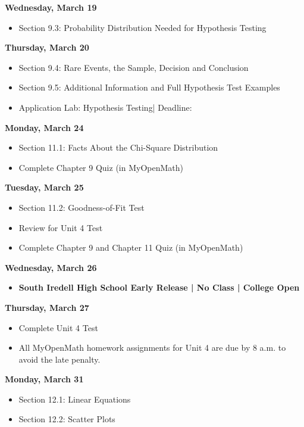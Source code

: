\documentclass[11pt]{article}
\begin{document}
\textbf{Wednesday, March 19}

\begin{itemize}
\item Section 9.3: Probability Distribution Needed for Hypothesis Testing
\end{itemize}

\textbf{Thursday, March 20}

\begin{itemize}
\item Section 9.4: Rare Events, the Sample, Decision and Conclusion
\item Section 9.5: Additional Information and Full Hypothesis Test Examples
\item Application Lab: Hypothesis Testing| Deadline:
\end{itemize}

\textbf{Monday, March 24}

\begin{itemize}
\item Section 11.1: Facts About the Chi-Square Distribution
\item Complete Chapter 9 Quiz (in MyOpenMath)
\end{itemize}

\textbf{Tuesday, March 25}

\begin{itemize}
\item Section 11.2: Goodness-of-Fit Test
\item Review for Unit 4 Test
\item Complete Chapter 9 and Chapter 11 Quiz (in MyOpenMath)
\end{itemize}

\textbf{Wednesday, March 26}

\begin{itemize}
\item \textbf{South Iredell High School Early Release | No Class | College Open}
\end{itemize}

\textbf{Thursday, March 27}

\begin{itemize}
\item Complete Unit 4 Test
\item All MyOpenMath homework assignments for Unit 4 are due by 8 a.m. to avoid the late penalty.
\end{itemize}

\textbf{Monday, March 31}

\begin{itemize}
\item Section 12.1: Linear Equations
\item Section 12.2: Scatter Plots
\end{itemize}
\end{document}
